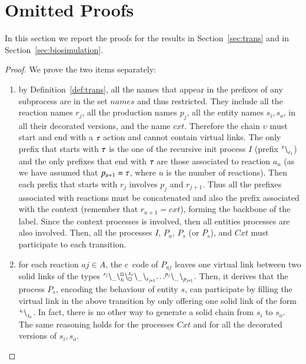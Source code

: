 \newpage

\section{Omitted Proofs}
In this section we report the proofs for the results in Section~\ref{sec:trans} and in Section~\ref{sec:biosimulation}.

\lemmastruct*
\begin{proof}
  We prove the two items separately:
  \begin{enumerate}
\item by Definition~\ref{def:trans}, all the names that appear in the prefixes of any subprocess are in the set $\mathit{names}$ and thus restricted. 
They include all the reaction names $r_j$, all the production names $p_j$, all the entity names $s_i,s_o$, in all their decorated versions, and the name $\mathit{cxt}$. 
Therefore the chain $\upsilon$ must start and end with a $\tau$ action and cannot contain virtual links.
The only prefix that starts with $\tau$ is the one of the recursive init process $I$ (prefix ${}^{\tau} \backslash_{r_1}^{}$) and the only prefixes that end with $\tau$ are those associated to reaction $a_u$ (as we have assumed that $p_{u+1} = \tau$, where $u$ is the number of reactions).
Then each prefix that starts with $r_j$ involves $p_j$ and $r_{j+1}$.
Thus all the prefixes associated with reactions must be concatenated and also the prefix associated with the context (remember that $r_{u+1} = \mathit{cxt}$), forming the backbone of the label.
Since the context processes is involved, then all entities processes are also involved.
Then, all the processes $I$, $P_a$, $P_s$ (or $\overline{P_s}$), and $\mathit{Cxt}$  must participate to each transition.
 \item for each reaction $aj \in A$, the c\CNA \ code of  $P_{aj}$ leaves one virtual link between two solid links of the types ${}^{r_j} \backslash_{\dots}^{} \backslash_{s_{i}}^{\scriptstyle {\square}}\backslash_{\scriptstyle {\square}}^{s_{o}}{}^{} \backslash_{\dots}^{}{}^{} \backslash_{r_{j+1}}^{} {\dots}{}^{p_j} \backslash_{\dots}^{}{}^{} \backslash_{p_{j+1}}^{}$. Then, it derives that the process $P_{s}$, encoding the behaviour of entity $s$, can participate by filling the virtual link in the above transition by only offering one solid link of the form ${}^{s_{i}} \backslash_{s_{o}}^{}$. In fact, there is no other way to generate a solid chain from $s_{i}$ to $s_{o}$.
 The same reasoning holds for the processes $\mathit{Cxt}$ and for all the decorated versions of $s_i,s_o$.
   \end{enumerate}
  \end{proof}
  

